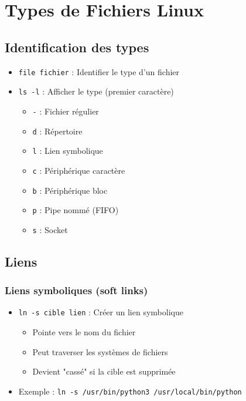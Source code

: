 \documentclass[12pt,a4paper]{article}
\begin{document}

\section{Types de Fichiers Linux}

\subsection{Identification des types}

\begin{itemize}
    \item \texttt{file fichier} : Identifier le type d'un fichier
    \item \texttt{ls -l} : Afficher le type (premier caractère)
    \begin{itemize}
        \item \texttt{-} : Fichier régulier
        \item \texttt{d} : Répertoire
        \item \texttt{l} : Lien symbolique
        \item \texttt{c} : Périphérique caractère
        \item \texttt{b} : Périphérique bloc
        \item \texttt{p} : Pipe nommé (FIFO)
        \item \texttt{s} : Socket
    \end{itemize}
\end{itemize}

\subsection{Liens}

\subsubsection{Liens symboliques (soft links)}
\begin{itemize}
    \item \texttt{ln -s cible lien} : Créer un lien symbolique
    \begin{itemize}
        \item Pointe vers le nom du fichier
        \item Peut traverser les systèmes de fichiers
        \item Devient "cassé" si la cible est supprimée
    \end{itemize}
    \item Exemple : \texttt{ln -s /usr/bin/python3 /usr/local/bin/python}
\end{itemize}
\end{document}
